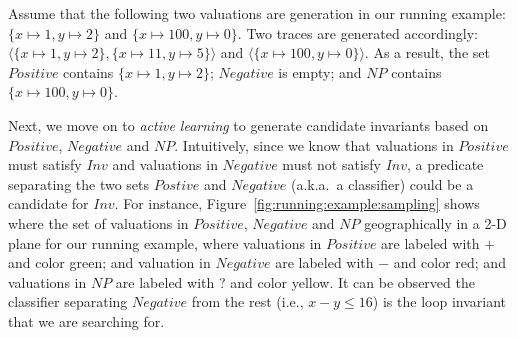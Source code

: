 %
%
\begin{example}
Assume that the following two valuations are generation in our running example: $\{x \mapsto 1, y \mapsto 2\}$ and $\{x \mapsto 100, y \mapsto 0\}$. Two traces are generated accordingly: $\langle \{x \mapsto 1, y \mapsto 2\}, \{x \mapsto 11, y \mapsto 5\} \rangle$ and $\langle \{x \mapsto 100, y \mapsto 0\} \rangle$. As a result, the set $\mathit{Positive}$ contains $\{x \mapsto 1, y \mapsto 2\}$; $\mathit{Negative}$ is empty; and $\mathit{NP}$ contains $\{x \mapsto 100, y \mapsto 0\}$.
\end{example}
Next, we move on to \emph{active learning} to generate candidate invariants based on $\mathit{Positive}$, $\mathit{Negative}$ and $\mathit{NP}$. Intuitively, since we know that valuations in $\mathit{Positive}$ must satisfy $\mathit{Inv}$ and valuations in $\mathit{Negative}$ must not satisfy $\mathit{Inv}$, a predicate separating the two sets $\mathit{Postive}$ and $\mathit{Negative}$ (a.k.a.~a classifier) could be a candidate for $\mathit{Inv}$.
For instance, Figure~\ref{fig:running:example:sampling} shows where the set of valuations in $\mathit{Positive}$, $\mathit{Negative}$ and $\mathit{NP}$ geographically in a 2-D plane for our running example, where valuations in $\mathit{Positive}$ are labeled with $+$ and color green; and valuation in $\mathit{Negative}$ are labeled with $-$ and color red; and valuations in $\mathit{NP}$ are labeled with ? and color yellow. It can be observed the classifier separating $\mathit{Negative}$ from the rest (i.e., $x - y \leq 16$) is the loop invariant that we are searching for.

